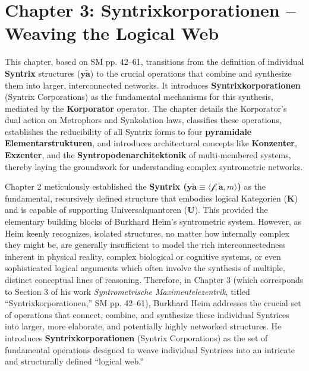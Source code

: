 \documentclass[12pt]{article}
\newcommand{\q}[1]{\enquote{#1}}
\newcommand{\kategorie}{\bm{K}}
\newcommand{\syntrix}{\bm{y\widetilde{a}}}
\newcommand{\metrophor}{\bm{\widetilde{a}}}
\newcommand{\synkolator}{\mathcal{f}}
\newcommand{\synkolationsstufe}{m}
\newcommand{\universalquantor}{\bm{U}}
\begin{document}
\section{Chapter 3: Syntrixkorporationen – Weaving the Logical Web}
\label{sec:chapter3}

This chapter, based on SM pp. 42–61, transitions from the definition of individual \textbf{Syntrix} structures (\(\syntrix\)) to the crucial operations that combine and synthesize them into larger, interconnected networks. It introduces \textbf{Syntrixkorporationen} (Syntrix Corporations) as the fundamental mechanisms for this synthesis, mediated by the \textbf{Korporator} operator. The chapter details the Korporator's dual action on Metrophors and Synkolation laws, classifies these operations, establishes the reducibility of all Syntrix forms to four \textbf{pyramidale Elementarstrukturen}, and introduces architectural concepts like \textbf{Konzenter}, \textbf{Exzenter}, and the \textbf{Syntropodenarchitektonik} of multi-membered systems, thereby laying the groundwork for understanding complex syntrometric networks.

Chapter 2 meticulously established the \textbf{Syntrix (\( \syntrix \equiv \langle \synkolator, \metrophor, \synkolationsstufe \rangle \))} as the fundamental, recursively defined structure that embodies logical Kategorien (\(\kategorie\)) and is capable of supporting Universalquantoren (\(\universalquantor\)). This provided the elementary building blocks of Burkhard Heim's syntrometric system. However, as Heim keenly recognizes, isolated structures, no matter how internally complex they might be, are generally insufficient to model the rich interconnectedness inherent in physical reality, complex biological or cognitive systems, or even sophisticated logical arguments which often involve the synthesis of multiple, distinct conceptual lines of reasoning. Therefore, in Chapter 3 (which corresponds to Section 3 of his work \textit{Syntrometrische Maximentelezentrik}, titled \q{Syntrixkorporationen,} SM pp. 42–61), Burkhard Heim addresses the crucial set of operations that connect, combine, and synthesize these individual Syntrices into larger, more elaborate, and potentially highly networked structures. He introduces \textbf{Syntrixkorporationen} (Syntrix Corporations) as the set of fundamental operations designed to weave individual Syntrices into an intricate and structurally defined \q{logical web.}
\end{document}
